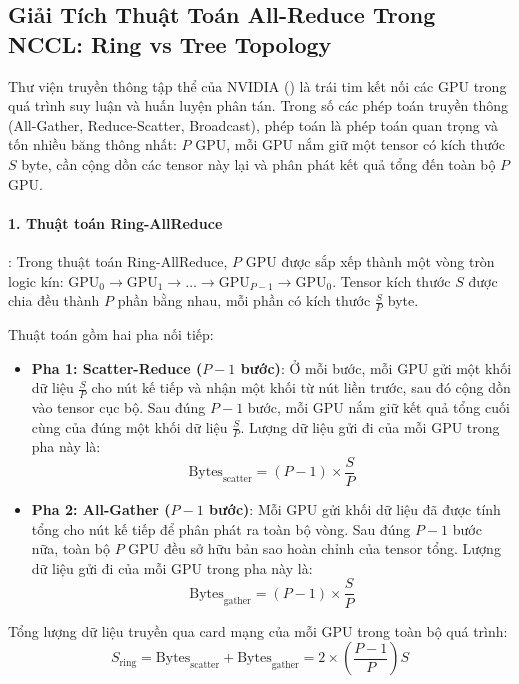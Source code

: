 \subsection{Giải Tích Thuật Toán All-Reduce Trong NCCL: Ring vs Tree Topology}
Thư viện truyền thông tập thể của NVIDIA () là trái tim kết nối các GPU trong quá trình suy luận và huấn luyện phân tán. Trong số các phép toán truyền thông (All-Gather, Reduce-Scatter, Broadcast), phép toán  là phép toán quan trọng và tốn nhiều băng thông nhất: $P$ GPU, mỗi GPU nắm giữ một tensor có kích thước $S$ byte, cần cộng dồn các tensor này lại và phân phát kết quả tổng đến toàn bộ $P$ GPU.

\paragraph{1. Thuật toán Ring-AllReduce}:
Trong thuật toán Ring-AllReduce, $P$ GPU được sắp xếp thành một vòng tròn logic kín: $\text{GPU}_0 \to \text{GPU}_1 \to \dots \to \text{GPU}_{P-1} \to \text{GPU}_0$.
Tensor kích thước $S$ được chia đều thành $P$ phần bằng nhau, mỗi phần có kích thước $\frac{S}{P}$ byte.

Thuật toán gồm hai pha nối tiếp:
\begin{itemize}
  \item \textbf{Pha 1: Scatter-Reduce ($P - 1$ bước)}:
  Ở mỗi bước, mỗi GPU gửi một khối dữ liệu $\frac{S}{P}$ cho nút kế tiếp và nhận một khối từ nút liền trước, sau đó cộng dồn vào tensor cục bộ. Sau đúng $P - 1$ bước, mỗi GPU nắm giữ kết quả tổng cuối cùng của đúng một khối dữ liệu $\frac{S}{P}$.
  Lượng dữ liệu gửi đi của mỗi GPU trong pha này là:
  \begin{equation}
  \text{Bytes}_{\text{scatter}} = (P - 1) \times \frac{S}{P}
  \end{equation}

  \item \textbf{Pha 2: All-Gather ($P - 1$ bước)}:
  Mỗi GPU gửi khối dữ liệu đã được tính tổng cho nút kế tiếp để phân phát ra toàn bộ vòng. Sau đúng $P - 1$ bước nữa, toàn bộ $P$ GPU đều sở hữu bản sao hoàn chỉnh của tensor tổng.
  Lượng dữ liệu gửi đi của mỗi GPU trong pha này là:
  \begin{equation}
  \text{Bytes}_{\text{gather}} = (P - 1) \times \frac{S}{P}
  \end{equation}
\end{itemize}

Tổng lượng dữ liệu truyền qua card mạng của mỗi GPU trong toàn bộ quá trình:
\begin{equation}
S_{\text{ring}} = \text{Bytes}_{\text{scatter}} + \text{Bytes}_{\text{gather}} = 2 \times \left(\frac{P - 1}{P}\right) S
\end{equation}


